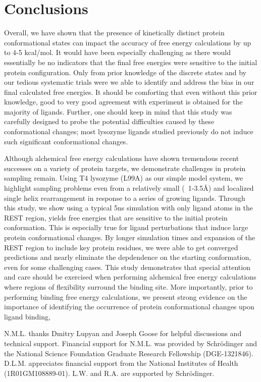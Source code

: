 \documentclass[journal=jctcce,manuscript=article]{achemso}
\begin{document}
\section{Conclusions}
Overall, we have shown that the presence of kinetically distinct protein conformational states can impact the accuracy of free energy calculations by up to 4-5 kcal/mol.
It would have been especially challenging as there would essentially be no indicators that the final free energies were sensitive to the initial protein configuration.
Only from prior knowledge of the discrete states and by our tedious systematic trials were we able to identify and address the bias in our final calculated free energies.  
It should be comforting that even without this prior knowledge, good to very good agreement with experiment is obtained for the majority of ligands. 
Further, one should keep in mind that this study was carefully designed to probe the potential difficulties caused by these conformational changes; most lysozyme ligands studied previously do not induce such significant conformational changes. 

Although alchemical free energy calculations have shown tremendous recent successes on a variety of protein targets\cite{FEPplus}, we demonstrate challenges in protein sampling remain. 
Using T4 lysozyme (L99A) as our simple model system, we highlight sampling problems even from a relatively small (~1-3.5\AA) and localized single helix rearrangement in response to a series of growing ligands.
Through this study, we show using a typical 5ns simulation with only ligand atoms in the REST region, yields free energies that are sensitive to the initial protein conformation.
This is especially true for ligand perturbations that induce large protein conformational changes.
By longer simulation times and expansion of the REST region to include key protein residues, we were able to get converged predictions and nearly eliminate the depdendence on the starting conformation, even for some challenging cases.
This study demonstrates that special attention and care should be exercised when performing alchemical free energy calculations where regions of flexibility surround the binding site.
More importantly, prior to performing binding free energy calculations, we present strong evidence on the importance of identifying the occurrence of protein conformational changes upon ligand binding, 

\begin{acknowledgement}
   N.M.L. thanks Dmitry Lupyan and Joseph Goose for helpful discussions and technical support. Financial support for N.M.L. was provided by Schr\"{o}dinger and the National Science Foundation Graduate Research Fellowship (DGE-1321846). D.L.M. appreciates financial support from the National Institutes of Health (1R01GM108889-01). L.W. and R.A. are supported by Schr\"{o}dinger.
\end{acknowledgement}
\end{document}
